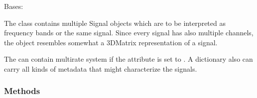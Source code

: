 \documentclass[letterpaper,10pt,english]{sphinxmanual}
\begin{document}
\begin{fulllineitems}
\label{\detokenize{classes:dsptoolbox.classes.multibandsignal.MultiBandSignal}}
\pysigstartsignatures
{}
\pysigstopsignatures
\sphinxAtStartPar
Bases: 

\sphinxAtStartPar
The  class contains multiple Signal objects which are
to be interpreted as frequency bands or the same signal. Since every
signal has also multiple channels, the object resembles somewhat a
3D\sphinxhyphen{}Matrix representation of a signal.

\sphinxAtStartPar
The  can contain multirate system if the attribute
 is set to . A dictionary also can carry
all kinds of metadata that might characterize the signals.
\begin{quote}\begin{description}
\begin{description}
\end{description}

\end{description}\end{quote}
\subsubsection*{Methods}



\end{fulllineitems}
\end{document}
